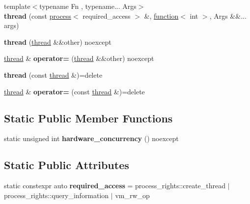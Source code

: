 \begin{DoxyCompactItemize}
{\footnotesize template$<$typename Fn , typename... Args$>$ }\\{\bfseries thread} (const \mbox{\hyperlink{classdistant_1_1kernel__objects_1_1process}{process}}$<$ required\+\_\+access $>$ \&, \mbox{\hyperlink{classdistant_1_1memory_1_1function}{function}}$<$ int $>$, Args \&\&... args)
\item 
\mbox{\label{classdistant_1_1kernel__objects_1_1thread_a5fddb325cc8c97f82f19f61cd7faa28a}} 
{\bfseries thread} (\mbox{\hyperlink{classdistant_1_1kernel__objects_1_1thread}{thread}} \&\&other) noexcept
\item 
\mbox{\label{classdistant_1_1kernel__objects_1_1thread_a2cd0031da63fcdbd03748cc53d19bbf2}} 
\mbox{\hyperlink{classdistant_1_1kernel__objects_1_1thread}{thread}} \& {\bfseries operator=} (\mbox{\hyperlink{classdistant_1_1kernel__objects_1_1thread}{thread}} \&\&other) noexcept
\item 
\mbox{\label{classdistant_1_1kernel__objects_1_1thread_a970e7208d4c29b628f72cfe5b3799900}} 
{\bfseries thread} (const \mbox{\hyperlink{classdistant_1_1kernel__objects_1_1thread}{thread}} \&)=delete
\item 
\mbox{\label{classdistant_1_1kernel__objects_1_1thread_acefab527ab136157070420f7f0ef0ab6}} 
\mbox{\hyperlink{classdistant_1_1kernel__objects_1_1thread}{thread}} \& {\bfseries operator=} (const \mbox{\hyperlink{classdistant_1_1kernel__objects_1_1thread}{thread}} \&)=delete
\end{DoxyCompactItemize}
\subsection*{Static Public Member Functions}
\begin{DoxyCompactItemize}
\item 
\mbox{\label{classdistant_1_1kernel__objects_1_1thread_a1f51ac51c4c9a7129b7226dc6578a5c5}} 
static unsigned int {\bfseries hardware\+\_\+concurrency} () noexcept
\end{DoxyCompactItemize}
\subsection*{Static Public Attributes}
\begin{DoxyCompactItemize}
\item 
\mbox{\label{classdistant_1_1kernel__objects_1_1thread_a74d71ef6367e7dbfc14edc3ff32c3a4e}} 
static constexpr auto {\bfseries required\+\_\+access} = process\+\_\+rights\+::create\+\_\+thread $\vert$ process\+\_\+rights\+::query\+\_\+information $\vert$ vm\+\_\+rw\+\_\+op
\end{DoxyCompactItemize}


